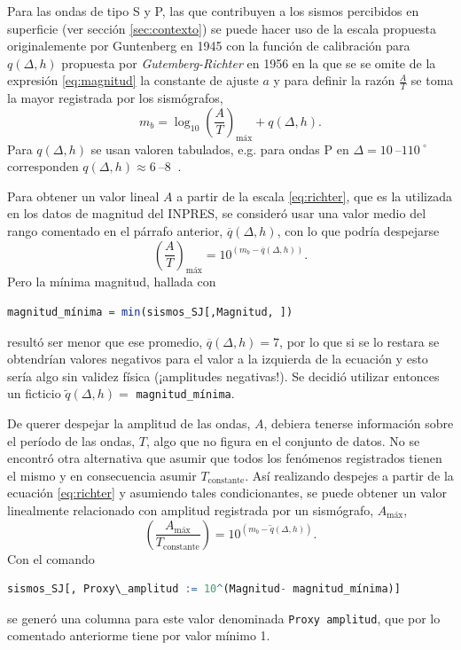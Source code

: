\documentclass[a4paper]{report}
\begin{document}
Para las ondas de tipo S y P, las que contribuyen a los sismos percibidos en superficie (ver sección \ref{sec:contexto}) se puede hacer uso de la escala propuesta originalemente por Guntenberg en 1945 con la función de calibración para \(q(\Delta, h)\) propuesta por \emph{Gutemberg-Richter} en 1956 \cite[ecuación 4.18]{fowler_solid_1990} en la que se se omite de la expresión \ref{eq:magnitud} la constante de ajuste \(a\) y para definir la razón \(\frac{A}{T}\) se toma la mayor registrada por los sismógrafos,
\begin{equation}
	m_b = \log_{10} \left( \frac{A}{T} \right)_\text{máx} + q(\Delta, h).
	\label{eq:richter}
\end{equation}
Para \(q(\Delta, h)\) se usan valoren tabulados, e.g. para ondas P en \(\Delta = \SIrange{10}{110}{} ^\circ\) corresponden \(q(\Delta, h) \approx \SIrange{6}{8}{}\) \cite{willian_l_ellsworth_earthquake_1991}.

Para obtener un valor lineal \(A\) a partir de la escala \ref{eq:richter}, que es la utilizada en los datos de magnitud del INPRES, se consideró usar una valor medio del rango comentado en el párrafo anterior, \(\overline{q}(\Delta,h)\), con lo que podría despejarse
\begin{equation}
	\left( \frac{A}{T} \right)_\text{máx} = 10^{(m_b - \overline{q}(\Delta,h) )}.
	\label{eq:linealizacionMagnitud}
\end{equation}
Pero la mínima magnitud, hallada con
\begin{lstlisting}[breaklines=true, language=R]
	magnitud_mínima = min(sismos_SJ[,Magnitud, ])
\end{lstlisting}	
resultó ser menor que ese promedio, \(\overline{q}(\Delta,h) = 7\), por lo que si se lo restara se obtendrían valores negativos para el valor a la izquierda de la ecuación y esto sería algo sin validez física (¡amplitudes negativas!).
Se decidió utilizar entonces un ficticio \(\tilde{q}(\Delta,h) = \) \lstinline[language = R]'magnitud_mínima'.  

De querer despejar la amplitud de las ondas, \(A\), debiera tenerse información sobre el período de las ondas, \(T\), algo que no figura en el conjunto de datos.
No se encontró otra alternativa que asumir que todos los fenómenos registrados tienen el mismo y en consecuencia asumir \(T_\text{constante}\).
Así realizando despejes a partir de la ecuación \ref{eq:richter} y asumiendo tales condicionantes, se puede obtener un valor linealmente relacionado con amplitud registrada por un sismógrafo, \(A_\text{máx}\),
\begin{equation}
	\left( \frac{A_\text{máx}}{T_\text{constante}} \right) = 10^{(m_b - \tilde{q}(\Delta, h))}.
	\label{eq:linealizacionMagnitud_final} 
\end{equation}
Con el comando
\begin{lstlisting}[breaklines=true, language=R]
sismos_SJ[, Proxy\_amplitud := 10^(Magnitud- magnitud_mínima)]
\end{lstlisting}
se generó una columna para este valor denominada \lstinline[language = R]'Proxy amplitud', que por lo comentado anteriorme tiene por valor mínimo \num{1}. 
\end{document}
